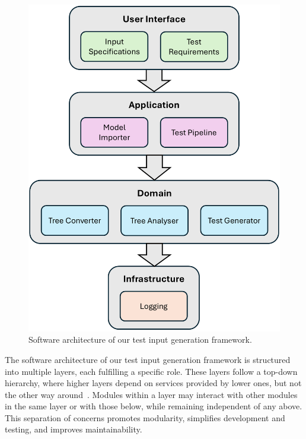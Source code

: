 \documentclass[
]{ceurart}
\theoremstyle{definition}
\begin{document}
\begin{figure}
\centering
\includegraphics[scale=0.6]{img/architecture}
\caption{Software architecture of our test input generation framework.}
\label{fig:architecture}
\end{figure}

The software architecture of our test input generation framework is structured into multiple layers, each fulfilling a specific role. These layers follow a top-down hierarchy, where higher layers depend on services provided by lower ones, but not the other way around~\cite{layer}. Modules within a layer may interact with other modules in the same layer or with those below, while remaining independent of any above. This separation of concerns promotes modularity, simplifies development and testing, and improves maintainability.
\end{document}
